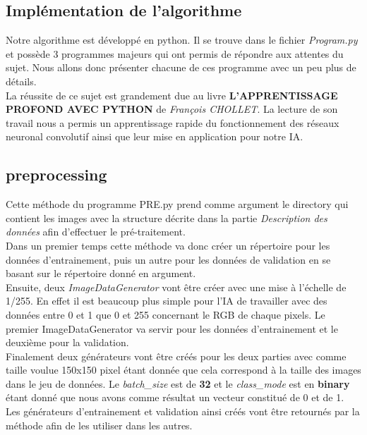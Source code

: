 \documentclass[12pt ,a4paper ]{article}
\begin{document}
\begin{multicols}{2}
\section{Implémentation de l'algorithme}
Notre algorithme est développé en python. Il se trouve dans le fichier \textit{Program.py} et possède 3 programmes majeurs qui ont permis de répondre aux attentes du sujet. Nous allons donc présenter chacune de ces programme avec un peu plus de détails. \\

La réussite de ce sujet est grandement due au livre \textbf{L'APPRENTISSAGE PROFOND AVEC PYTHON} de \textit{François CHOLLET}. La lecture de son travail nous a permis un apprentissage rapide du fonctionnement des réseaux neuronal convolutif ainsi que leur mise en application pour notre IA. 

\subsection{preprocessing}
Cette méthode du programme PRE.py prend comme argument le directory qui contient les images avec la structure décrite dans la partie \textit{Description des données} afin d'effectuer le pré-traitement. \\

Dans un premier temps cette méthode va donc créer un répertoire pour les données d'entrainement, puis un autre pour les données de validation en se basant sur le répertoire donné en argument.\\

Ensuite, deux \textit{ImageDataGenerator} vont être créer avec une mise à l'échelle de 1/255. En effet il est beaucoup plus simple pour l'IA de travailler avec des données entre 0 et 1 que 0 et 255 concernant le RGB de chaque pixels. Le premier ImageDataGenerator va servir pour les données d'entrainement et le deuxième pour la validation.\\

Finalement deux générateurs vont être créés pour les deux parties avec comme taille voulue 150x150 pixel étant donnée que cela correspond à la taille des images dans le jeu de données. Le \textit{batch\_size} est de \textbf{32} et le \textit{class\_mode} est en \textbf{binary} étant donné que nous avons comme résultat un vecteur constitué de 0 et de 1.\\

Les générateurs d'entrainement et validation ainsi créés vont être retournés par la méthode afin de les utiliser dans les autres. 


\end{multicols}
\end{document}

